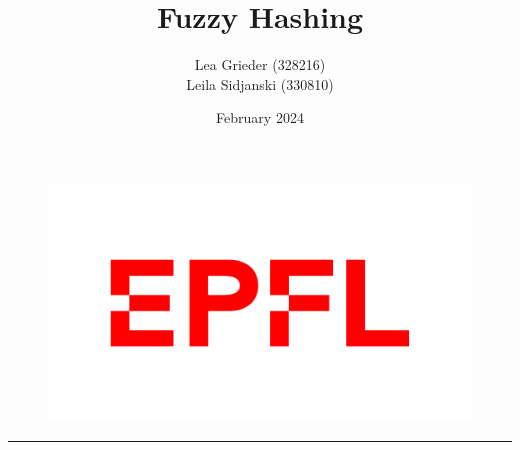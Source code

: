 \documentclass[12pt, a4paper, openany]{article}
\title{Fuzzy Hashing}
\author{Lea Grieder (328216)\\Leila Sidjanski (330810)}
\date{February 2024}
\begin{document}
\pagestyle{fancy}
\maketitle
\begin{figure}[h]
\includegraphics[scale=0.1]{latex-img/logo-epfl.png}
\centering
\end{figure}
\par\noindent\rule{\textwidth}{0.4pt}
\tableofcontents
\thispagestyle{fancy}

\newpage










\newpage

\appendix
\end{document}

